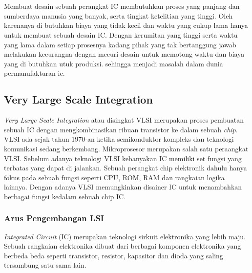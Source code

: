 % 

\chapter{\babDua}
Membuat desain sebuah perangkat IC membutuhkan proses yang panjang dan sumberdaya manusia yang banyak, serta tingkat ketelitian yang tinggi. Oleh karenanya di butuhkan biaya yang tidak kecil dan waktu yang cukup lama hanya untuk membuat sebuah desain IC. Dengan kerumitan yang tinggi serta waktu yang lama dalam setiap prosesnya kadang pihak yang tak bertanggung jawab melakukan kecurangna dengan mecuri desain untuk memotong waktu dan biaya yang di butuhkan utuk produksi. sehingga menjadi masalah dalam dunia permanufakturan ic. \cite{Azriel2017}

% 

\section{Very Large Scale Integration}
\textit{Very Large Scale Integration} atau disingkat VLSI merupakan proses pembuatan sebuah IC dengan mengkombinasikan ribuan transistor ke dalam sebuah \textit{chip}. VLSI ada sejak tahun 1970-an ketika semikonduktor kompleks dan teknologi komunikasi sedang berkembang. Mikroprosesor merupakan salah satu peraangkat VLSI. Sebelum adanya teknologi VLSI kebanyakan IC memiliki set fungsi yang terbatas yang dapat di jalankan. Sebuah perangkat chip elektronik dahulu hanya fokus pada sebuah fungsi seperti CPU, ROM, RAM dan rangkaian logika lainnya. Dengan adanya VLSI memungkinkan disainer IC untuk menambahkan berbagai fungsi kedalam sebuah chip IC. \cite{vlsi.hist} 

% 

\subsection{Arus Pengembangan LSI}
\textit{Integrated Circuit} (IC) merupakan teknologi sirkuit elektronika yang lebih maju. Sebuah rangkaian elektronika dibuat dari berbagai komponen elektronika yang berbeda beda seperti transistor, resistor, kapasitor dan dioda yang saling tersambung satu sama lain. \cite{vlsi.hist}

